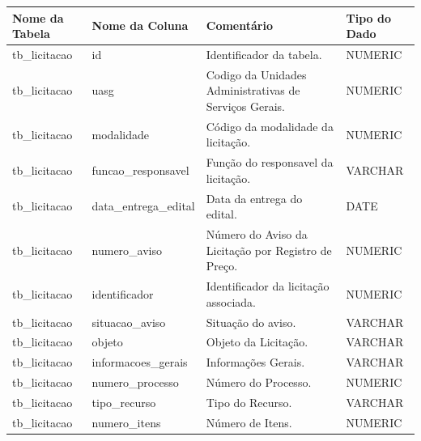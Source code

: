 \begin{landscape}
\begin{table}[ht]
	\centering
\begin{tabular}{|l|l|l|l|}
	\hline
	Nome da Tabela & Nome da Coluna            & Comentário                                                             & Tipo do Dado \\ \hline
	tb\_licitacao  & id                        & Identificador da tabela.                                               & NUMERIC      \\ \hline
	tb\_licitacao  & uasg                      & Codigo da Unidades Administrativas de Serviços Gerais.                 & NUMERIC      \\ \hline
	tb\_licitacao  & modalidade                & Código da modalidade da licitação.                                     & NUMERIC      \\ \hline
	tb\_licitacao  & funcao\_responsavel       & Função do responsavel da licitação.                                    & VARCHAR      \\ \hline
	tb\_licitacao  & data\_entrega\_edital     & Data da entrega do edital.                                             & DATE         \\ \hline
	tb\_licitacao  & numero\_aviso             & Número do Aviso da Licitação por Registro de Preço.                    & NUMERIC      \\ \hline
	tb\_licitacao  & identificador             & Identificador da licitação associada.                                  & NUMERIC      \\ \hline
	tb\_licitacao  & situacao\_aviso           & Situação do aviso.                                                     & VARCHAR      \\ \hline
	tb\_licitacao  & objeto                    & Objeto da Licitação.                                                   & VARCHAR      \\ \hline
	tb\_licitacao  & informacoes\_gerais       & Informações Gerais.                                                    & VARCHAR      \\ \hline
	tb\_licitacao  & numero\_processo          & Número do Processo.                                                    & NUMERIC      \\ \hline
	tb\_licitacao  & tipo\_recurso             & Tipo do Recurso.                                                       & VARCHAR      \\ \hline
	tb\_licitacao  & numero\_itens             & Número de Itens.                                                       & NUMERIC      \\ \hline

\end{tabular}
\end{table}
\end{landscape}
